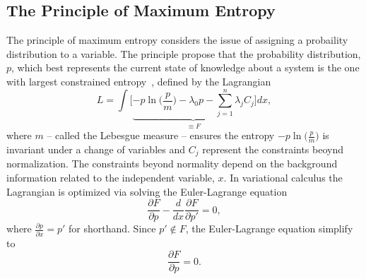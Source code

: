 \documentclass[fleqn,usenatbib,nofootinbib]{revtex4-2}
\begin{document}
	\begin{appendices}
		
		\section{The Principle of Maximum Entropy}
		\label{app:maxent}
		The principle of maximum entropy considers the issue of assigning a probaility distribution to a variable. The principle propose that the probability distribution, $p$, which best represents the current state of knowledge about a system is the one with largest constrained entropy~\citep{Sivia2006}, defined by the Lagrangian
		\begin{equation}
			L = \int\bigg[\underbrace{-p\ln\bigg(\frac{p}{m}\bigg)-\lambda_0 p-\sum_{j=1}^{n}\lambda_jC_j}_{\equiv F}\bigg]dx  ,
			\label{eq:Q}
		\end{equation}
		where $m$ -- called the Lebesgue measure -- ensures the entropy $-p\ln\big(\frac{p}{m}\big)$ is invariant under a change of variables and $C_j$ represent the constraints beoynd normalization. The constraints beyond normality depend on the background information related to the independent variable, $x$. In variational calculus the Lagrangian is optimized via solving the Euler-Lagrange equation
		\begin{equation}
			\frac{\partial F}{\partial p}-\frac{d}{dx}\frac{\partial F}{\partial p'}=0,
		\end{equation}
		where $\frac{\partial p}{\partial x} = p'$ for shorthand. Since $p'\notin F$, the Euler-Lagrange equation simplify to
		\begin{equation}
			\frac{\partial F}{\partial p}=0.
		\end{equation}
		

\end{appendices}
\end{document}
